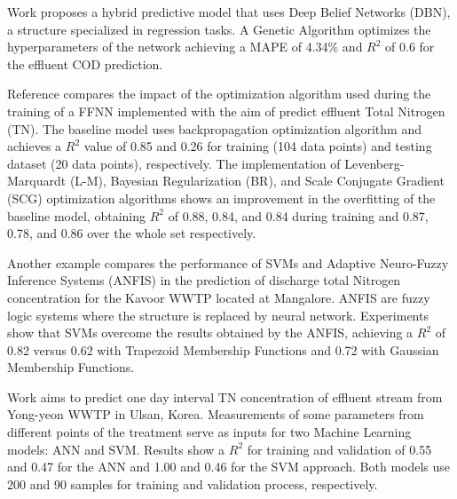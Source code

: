 Work \cite{Niu2020} proposes a hybrid predictive model that uses Deep Belief Networks (DBN), a  structure specialized in regression tasks. A Genetic Algorithm optimizes the hyperparameters of the network achieving a MAPE of 4.34\% and \begin{math}R^2\end{math} of 0.6 for the effluent COD prediction.

Reference \cite{Zhao2021} compares the impact of the optimization algorithm used during the training of a FFNN implemented with the aim of predict effluent Total Nitrogen (TN). The baseline model uses backpropagation optimization algorithm and achieves a \begin{math}R^2\end{math} value of 0.85 and 0.26 for training (104 data points) and testing dataset (20 data points), respectively. The implementation of Levenberg-Marquardt (L-M), Bayesian Regularization (BR), and Scale Conjugate Gradient (SCG) optimization algorithms shows an improvement in the overfitting of the baseline model, obtaining \begin{math}R^2\end{math} of 0.88, 0.84, and 0.84 during training and 0.87, 0.78, and 0.86 over the whole set respectively.

Another example \cite{Manu2017} compares the performance of  SVMs and Adaptive Neuro-Fuzzy Inference Systems (ANFIS) in the prediction of discharge total Nitrogen concentration for the Kavoor WWTP located at Mangalore. ANFIS are fuzzy logic systems where the structure is replaced by neural network. Experiments show that SVMs overcome the results obtained by the ANFIS, achieving a \begin{math}R^2\end{math} of 0.82 versus 0.62 with Trapezoid Membership Functions and 0.72 with Gaussian Membership Functions. 

Work \cite{Guo2015} aims to predict one day interval TN concentration of effluent stream from Yong-yeon \ac{WWTP} in Ulsan, Korea. Measurements of some parameters from different points of the treatment serve as inputs for two Machine Learning models: ANN and SVM. Results show a \begin{math}R^2\end{math} for training and validation of 0.55 and 0.47 for the ANN and 1.00 and 0.46 for the SVM approach. Both models use 200 and 90 samples for training and validation process, respectively.

